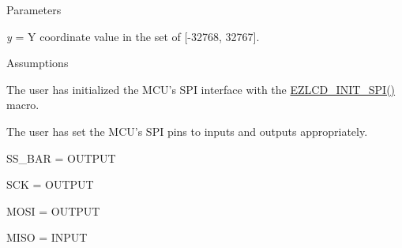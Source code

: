 \begin{DoxyParagraph}{Parameters}

\begin{DoxyItemize}
\item {\itshape y} = Y coordinate value in the set of \mbox{[}-\/32768, 32767\mbox{]}.
\end{DoxyItemize}
\end{DoxyParagraph}
\begin{DoxyParagraph}{Assumptions}

\begin{DoxyItemize}
\item The user has initialized the M\-C\-U's S\-P\-I interface with the \hyperlink{group__ez_l_c_d__103__common_gaf5c3b2dedc950d34e0381946fbb32428}{E\-Z\-L\-C\-D\-\_\-\-I\-N\-I\-T\-\_\-\-S\-P\-I()} macro.
\item The user has set the M\-C\-U's S\-P\-I pins to inputs and outputs appropriately. \par
\par

\begin{DoxyItemize}
\item S\-S\-\_\-\-B\-A\-R = O\-U\-T\-P\-U\-T
\item S\-C\-K = O\-U\-T\-P\-U\-T
\item M\-O\-S\-I = O\-U\-T\-P\-U\-T
\item M\-I\-S\-O = I\-N\-P\-U\-T 
\end{DoxyItemize}
\end{DoxyItemize}
\end{DoxyParagraph}
